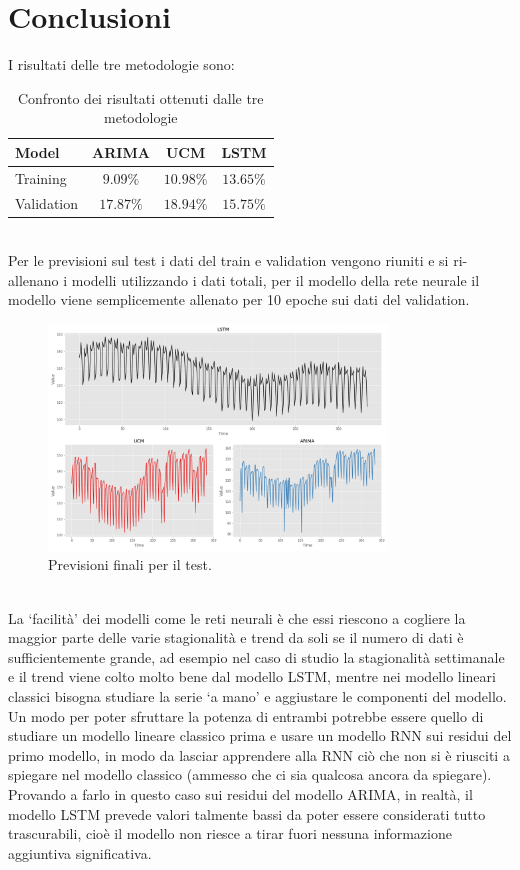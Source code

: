 \documentclass[12pt, onecolumn]{article}
\begin{document}
\section*{Conclusioni}
I risultati delle tre metodologie sono:
\begin{table}[!h]
  \centering
  \begin{tabular}{|l|c|c|c|}
    \hline
    Model & ARIMA & UCM & LSTM\\
    \hline
    Training & $9.09\%$ & $10.98\%$ & $13.65\%$\\
    Validation & $17.87\%$ & $18.94\%$ & $15.75\%$\\
    \hline
  \end{tabular}
  \caption{Confronto dei risultati ottenuti dalle tre metodologie }
  \label{tab:confronto}
\end{table}\\
Per le previsioni sul test i dati del train e validation vengono riuniti e si ri-allenano i modelli utilizzando i dati totali, per il modello della rete neurale il modello viene semplicemente allenato per 10 epoche sui dati del validation. 
\begin{figure}[!h]
  \centering
  \includegraphics[width=\linewidth,height=6cm]{imgs/test_results.png}
  \caption{Previsioni finali per il test.}
  \label{fig:test_pred}
\end{figure}\\
La `facilità' dei modelli come le reti neurali è che essi riescono a cogliere la maggior parte delle varie stagionalità e trend da soli se il numero di dati è sufficientemente grande, ad esempio nel caso di studio la stagionalità settimanale e il trend viene colto molto bene dal modello LSTM, mentre nei modello lineari classici bisogna studiare la serie `a mano' e aggiustare le componenti del modello.\\
Un modo per poter sfruttare la potenza di entrambi potrebbe essere quello di studiare un modello lineare classico prima e usare un modello RNN sui residui del primo modello, in modo da lasciar apprendere alla RNN ciò che non si è riusciti a spiegare nel modello classico (ammesso che ci sia qualcosa ancora da spiegare).\\
Provando a farlo in questo caso sui residui del modello ARIMA, in realtà, il modello LSTM prevede valori talmente bassi da poter essere considerati tutto trascurabili, cioè il modello non riesce a tirar fuori nessuna informazione aggiuntiva significativa.
\end{document}
